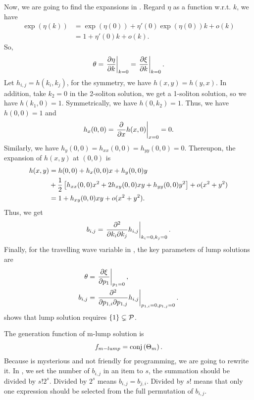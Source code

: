 Now, we are going to find the expansions in . Regard $\eta$ as a function w.r.t. $k$, we have 
\begin{equation}
\begin{split}
\exp(\eta(k))&=\exp(\eta(0))+\eta'(0)\exp(\eta(0))k+o(k)\\ 
&=1+\eta'(0)k+o(k). 
\end{split}
\end{equation}
So, 
\begin{equation}
\theta=\left.{\frac{\partial \eta}{\partial k}}\right|_{k=0}=\left.{\frac{\partial \xi}{\partial k}}\right|_{k=0}.
\end{equation}
Let $h_{i,j}=h(k_i,k_j)$, for the symmetry, we have $h(x,y)=h(y,x)$. In addition, take $k_2=0$ in the 2-soliton solution, we get a 1-soliton solution, so we have $h(k_1,0)=1$. Symmetrically, we have $h(0,k_2)=1$. Thus, we have $h(0,0)=1$ and
\begin{equation}
    h_x(0,0)=\left.{\frac{\partial}{\partial x}h(x,0)}\right|_{x=0}=0.
\end{equation}
Similarly, we have $h_y(0,0)=h_{xx}(0,0)=h_{yy}(0,0)=0$. Thereupon, the expansion of $h(x,y)$ at $(0,0)$ is 
\begin{equation}
\begin{split}
h(x,y)&=h(0,0)+h_x(0,0)x+h_y(0,0)y \\ 
&+\frac{1}{2}\left[h_{xx}(0,0)x^2+2h_{xy}(0,0)xy+h_{yy}(0,0)y^2\right]+o(x^2+y^2) \\ 
&=1+h_{xy}(0,0)xy+o(x^2+y^2).
\end{split}
\end{equation}
Thus, we get 
\begin{equation}
    b_{i,j}=\left.{\frac{\partial^2}{\partial k_i\partial k_j}h_{i,j}}\right|_{k_i=0,k_j=0}.
\end{equation}
Finally, for the travelling wave variable in , the key parameters of lump solutions are
\begin{equation}
\begin{split}
    \theta &= \left.{\frac{\partial \xi}{\partial p_1}}\right|_{p_1=0}, \\
    b_{i,j}&= \left.{\frac{\partial^2}{\partial p_{1,i}\partial p_{1,j}}h_{i,j}}\right|_{p_{1,i}=0,p_{1,j}=0}.
\end{split} \label{p-lump}
\end{equation}
 shows that lump solution requires $\left\{1\right\}\subsetneq \mathcal{P}$.

The generation function of m-lump solution is
\begin{equation}
    f_{m-lump}={\rm conj}\left(\Theta_m\right).
\end{equation}
Because  is mysterious and not friendly for programming, we are going to rewrite it. In , we set the number of $b_{i,j}$ in an item to $s$, the summation should be divided by $s!2^s$. Divided by $2^s$ means $b_{i,j}=b_{j,i}$. Divided by $s!$ means that only one expression should be selected from the full permutation of $b_{i,j}$. 

